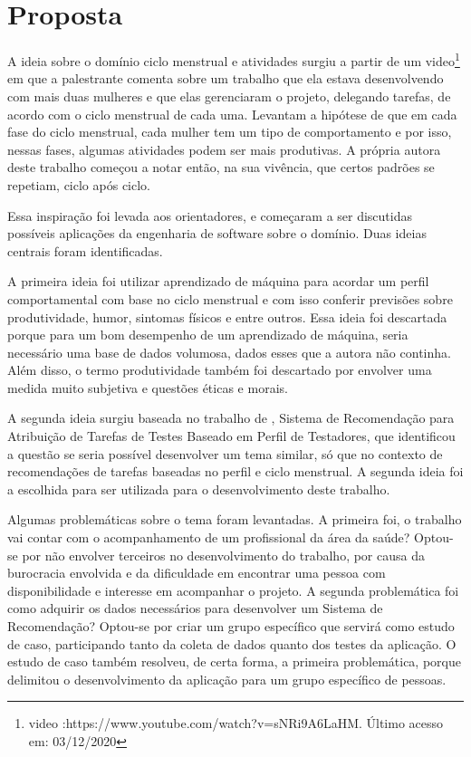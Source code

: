 \chapter[Proposta]{Proposta}
\label{ch:proposta}

A ideia sobre o domínio ciclo menstrual e atividades surgiu a 
partir de um video\footnote{video :https://www.youtube.com/watch?v=sNRi9A6LaHM. Último acesso em: 03/12/2020} em que a palestrante comenta sobre um 
trabalho que ela estava desenvolvendo com mais duas  
mulheres e que elas gerenciaram o projeto, delegando tarefas, de 
acordo com o ciclo menstrual de cada uma. Levantam a hipótese de 
que em cada fase do ciclo menstrual, cada mulher tem um tipo 
de comportamento e por isso, nessas fases, algumas atividades 
podem ser mais produtivas.
A própria autora deste trabalho começou a notar então, na sua 
vivência, que certos padrões se repetiam, ciclo após ciclo.

Essa inspiração foi levada aos 
orientadores, e começaram a ser discutidas possíveis aplicações da 
engenharia de software sobre o domínio. Duas ideias centrais 
foram identificadas. 

A primeira ideia foi utilizar aprendizado de máquina para 
acordar um perfil comportamental com base no ciclo menstrual e 
com isso conferir previsões sobre produtividade, humor, sintomas 
físicos e entre outros. Essa ideia foi descartada porque para 
um bom desempenho de um aprendizado de máquina, seria necessário 
uma base de dados volumosa, dados esses que 
a autora não continha. Além disso, o termo produtividade também 
foi descartado por envolver uma medida muito subjetiva e questões éticas e morais. 

A segunda ideia surgiu baseada no trabalho de , Sistema de Recomendação para Atribuição de Tarefas de Testes 
Baseado em Perfil de Testadores, que identificou a questão se seria 
possível desenvolver um tema similar, só que no
contexto de recomendações de tarefas baseadas no perfil e 
ciclo menstrual. A segunda ideia foi a escolhida para ser 
utilizada para o desenvolvimento deste trabalho.

Algumas problemáticas sobre o tema foram levantadas. A primeira 
foi, o trabalho vai contar com o acompanhamento de um 
profissional da área da saúde? Optou-se por não envolver 
terceiros no desenvolvimento do trabalho, por causa da 
burocracia envolvida e da dificuldade 
em encontrar uma pessoa com disponibilidade e interesse em 
acompanhar o projeto. A segunda problemática foi 
como adquirir os dados necessários para desenvolver um 
Sistema de Recomendação? Optou-se por criar um grupo 
específico que servirá como estudo de caso, participando tanto 
da coleta de dados quanto dos testes da aplicação. O estudo de 
caso também resolveu, de certa forma, a primeira problemática, 
porque delimitou o desenvolvimento da aplicação para um grupo 
específico de pessoas. 


